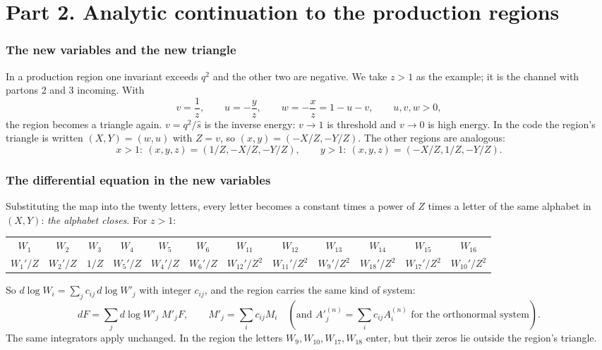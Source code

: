 \documentclass[11pt]{article}
\begin{document}
\part*{Part 2. Analytic continuation to the production regions}

\section{The new variables and the new triangle}
In a production region one invariant exceeds $q^2$ and the other two are negative. We take $z>1$ as the example; it is
the channel with partons 2 and 3 incoming. With
\[
  v=\frac1z,\qquad u=-\frac yz,\qquad w=-\frac xz=1-u-v,\qquad u,v,w>0,
\]
the region becomes a triangle again. $v=q^2/\hat s$ is the inverse energy: $v\to1$ is threshold and $v\to0$ is high
energy. In the code the region's triangle is written $(X,Y)=(w,u)$ with $Z=v$, so $(x,y)=(-X/Z,-Y/Z)$. The other regions
are analogous:
\[
  x>1:\ (x,y,z)=(1/Z,-X/Z,-Y/Z),\qquad y>1:\ (x,y,z)=(-X/Z,1/Z,-Y/Z).
\]

\section{The differential equation in the new variables}
Substituting the map into the twenty letters, every letter becomes a constant times a power of $Z$ times a letter of the
same alphabet in $(X,Y)$: \emph{the alphabet closes}. For $z>1$:
\begin{center}\small
\begin{tabular}{@{}cccccccccccc@{}}\toprule
$W_1$&$W_2$&$W_3$&$W_4$&$W_5$&$W_6$&$W_{11}$&$W_{12}$&$W_{13}$&$W_{14}$&$W_{15}$&$W_{16}$\\
$W_1'/Z$&$W_2'/Z$&$1/Z$&$W_5'/Z$&$W_4'/Z$&$W_6'/Z$&$W_{12}'/Z^2$&$W_{11}'/Z^2$&$W_9'/Z^2$&$W_{18}'/Z^2$&$W_{17}'/Z^2$&$W_{10}'/Z^2$\\\bottomrule
\end{tabular}
\end{center}
So $d\log W_i=\sum_jc_{ij}\,d\log W'_j$ with integer $c_{ij}$, and the region carries the same kind of system:
\[
  dF=\sum_jd\log W'_j\;M'_jF,\qquad M'_j=\sum_ic_{ij}M_i\quad(\text{and }A'^{(n)}_j=\sum_ic_{ij}A_i^{(n)}\text{ for the orthonormal system}).
\]
The same integrators apply unchanged. In the region the letters $W_9,W_{10},W_{17},W_{18}$ enter, but their zeros lie
outside the region's triangle.
\end{document}

